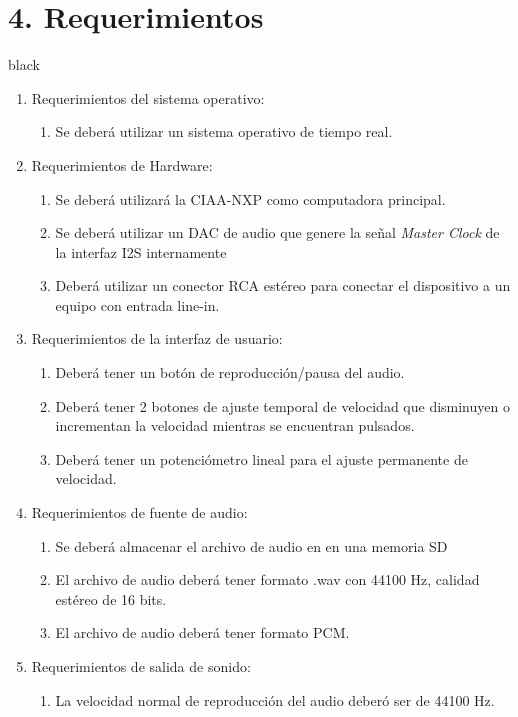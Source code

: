 \documentclass[11pt]{charter}
\begin{document}
\section{4. Requerimientos}
\label{sec:requerimientos}
\begin{consigna}{black}
\begin{enumerate}
\item Requerimientos del sistema operativo:
	\begin{enumerate}
	\item Se deberá utilizar un sistema operativo de tiempo real.
	\end{enumerate}
\item Requerimientos de Hardware:
	\begin{enumerate}
	\item Se deberá utilizará la CIAA-NXP como computadora principal.
	\item Se deberá utilizar un DAC de audio que genere la señal \textit{Master Clock} de la interfaz I2S internamente 
	\item Deberá utilizar un conector RCA estéreo para conectar el dispositivo a un equipo con entrada  line-in.
	\end{enumerate}
\item Requerimientos de la interfaz de usuario:
	\begin{enumerate}
	\item Deberá tener un botón de reproducción/pausa del audio.
	\item Deberá tener 2 botones de ajuste temporal de velocidad que disminuyen o incrementan la velocidad mientras se encuentran pulsados.
	\item Deberá tener un potenciómetro lineal para el ajuste permanente de velocidad.	
	\end{enumerate}
\item Requerimientos de fuente de audio:
	\begin{enumerate}
	\item Se deberá almacenar el archivo de audio en en una memoria SD
	\item El archivo de audio deberá tener formato .wav con 44100 Hz, calidad estéreo de 16 bits.
	\item El archivo de audio deberá tener formato PCM.
	\end{enumerate}
\item Requerimientos de salida de sonido:
	\begin{enumerate}
	\item La velocidad normal de reproducción del audio deberó ser de 44100 Hz.

\end{enumerate}
\end{enumerate}
\end{consigna}
\end{document}
